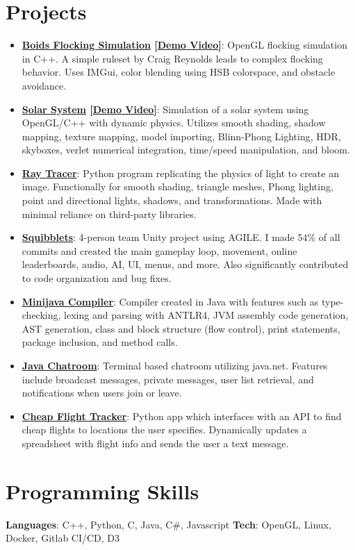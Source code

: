 \documentclass[letterpaper,11pt]{article}
\newcommand{\resumeItem}[2]{
  \item\small{
    \textbf{#1}{: #2 \vspace{-2pt}}
  }
}
\newcommand{\resumeSubItem}[2]{\resumeItem{#1}{#2}\vspace{-4pt}}
\newcommand{\resumeSubHeadingListStart}{\begin{itemize}[leftmargin=*]}
\newcommand{\resumeSubHeadingListEnd}{\end{itemize}}
\begin{document}
\section{Projects}
  \resumeSubHeadingListStart
	\resumeSubItem{\href{https://github.com/Nathan-Hutton/boids}{Boids Flocking Simulation} [\href{https://www.youtube.com/watch?v=AMXlc43AJDk}{Demo Video}]}
	{OpenGL flocking simulation in C++. A simple ruleset by Craig Reynolds leads to complex flocking behavior. Uses IMGui, color blending using HSB colorspace, and obstacle avoidance.}
	\resumeSubItem{\href{https://github.com/Nathan-Hutton/solar-system}{Solar System} [\href{https://www.youtube.com/watch?v=KRmn0imU6Xk}{Demo Video}]}
      {Simulation of a solar system using OpenGL/C++ with dynamic physics. Utilizes smooth shading, shadow mapping, texture mapping, model importing, Blinn-Phong Lighting, HDR, skyboxes, verlet numerical integration, time/speed manipulation, and bloom.}
    \resumeSubItem{\href{https://github.com/Nathan-Hutton/Ray-Tracer}{Ray Tracer}}
      {Python program replicating the physics of light to create an image. Functionally for smooth
shading, triangle meshes, Phong lighting, point and directional lights, shadows, and transformations. Made with minimal reliance on third-party libraries.}
    \resumeSubItem{\href{https://github.com/CharlesBirdgv/Squibblets}{Squibblets}}
      {4-person team Unity project using AGILE. I made 54\% of all commits and created the main
gameplay loop, movement, online leaderboards, audio, AI, UI, menus, and more. Also significantly
contributed to code organization and bug fixes.}
    \resumeSubItem{\href{https://github.com/Nathan-Hutton/Minijava_Compiler_AST}{Minijava Compiler}}
    {Compiler created in Java with features such as type-checking, lexing and parsing
with ANTLR4, JVM assembly code generation, AST generation, class and block structure (flow control),
print statements, package inclusion, and method calls.}
    \resumeSubItem{\href{https://github.com/Nathan-Hutton/Chatroom}{Java Chatroom}}
    {Terminal based chatroom utilizing java.net. Features include broadcast messages, private messages, user list retrieval, and notifications when users join or leave.}
    \resumeSubItem{\href{https://github.com/Nathan-Hutton/Flight-Finder}{Cheap Flight Tracker}}
    {Python app which interfaces with an API to find cheap flights to locations the user
specifies. Dynamically updates a spreadsheet with flight info and sends the user a text message.}
  \resumeSubHeadingListEnd

%
\section{Programming Skills}
 \textbf{Languages}{: C++, Python, C, Java, C\#, Javascript}
 \hfill
 \textbf{Tech}{: OpenGL, Linux, Docker, Gitlab CI/CD, D3}

\end{document}
